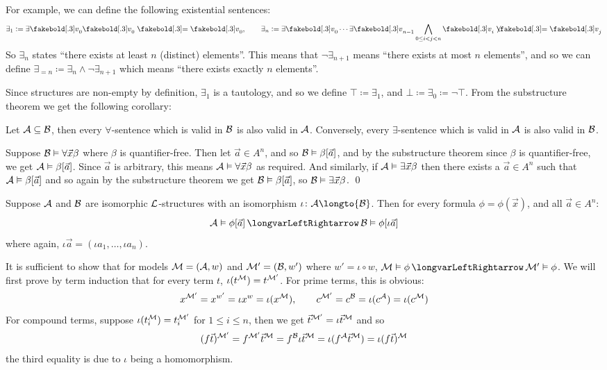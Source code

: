 \edefn

For example, we can define the following existential sentences:
$$ \exists_1 \coloneqq \exists\v_0\v_0\eq\v_0,\qquad \exists_n\coloneqq \exists\v_0\cdots\exists\v_{n-1}\bigwedge_{0\leq i<j<n}\v_i\neqb\v_j $$
So $\exists_n$ states ``there exists at least $n$ (distinct) elements''.
This means that $\neg\exists_{n+1}$ means ``there exists at most $n$ elements'', and so we can define $\exists_{=n}\coloneqq\exists_n\land\neg\exists_{n+1}$ which means ``there exists exactly $n$
elements''.

Since structures are non-empty by definition, $\exists_1$ is a tautology, and so we define $\top\coloneqq\exists_1$, and $\bot\coloneqq\exists_0\coloneqq\neg\top$.
From the substructure theorem we get the following corollary:

\bcoro[name=substructurecoro]

    Let ${\cal A}\subseteq{\cal B}$, then every $\forall$-sentence which is valid in ${\cal B}$ is also valid in ${\cal A}$.
    Conversely, every $\exists$-sentence which is valid in ${\cal A}$ is also valid in ${\cal B}$.

\ecoro

Suppose ${\cal B}\vDash\forall\vec x\beta$ where $\beta$ is quantifier-free.
Then let $\vec a\in A^n$, and so ${\cal B}\vDash\beta[\vec a]$, and by the substructure theorem since $\beta$ is quantifier-free, we get ${\cal A}\vDash\beta[\vec a]$.
Since $\vec a$ is arbitrary, this means ${\cal A}\vDash\forall\vec x\beta$ as required.
And similarly, if ${\cal A}\vDash\exists\vec x\beta$ then there exists a $\vec a\in A^n$ such that ${\cal A}\vDash\beta[\vec a]$ and so again by the substructure theorem we get ${\cal B}\vDash\beta[\vec a]$,
so ${\cal B}\vDash\exists\vec x\beta$.
\qed

\bthrm[title=The Invariance Theorem, name=invariancetheorem]

    Suppose ${\cal A}$ and ${\cal B}$ are isomorphic $\cal L$-structures with an isomorphism $\iota\colon{\cal A}\longto{\cal B}$.
    Then for every formula $\phi=\phi(\vec x)$, and all $\vec a\in A^n$:
    $$ {\cal A}\vDash\phi[\vec a] \iff {\cal B}\vDash\phi[\iota\vec a] $$
    where again, $\iota\vec a=(\iota a_1,\dots,\iota a_n)$.

\ethrm

It is sufficient to show that for models ${\cal M}=({\cal A},w)$ and ${\cal M'}=({\cal B},w')$ where $w'=\iota\circ w$, ${\cal M}\vDash\phi\iff{\cal M}'\vDash\phi$.
We will first prove by term induction that for every term $t$, $\iota(t^{\cal M})=t^{\cal M'}$.
For prime terms, this is obvious:
$$ x^{\cal M'} = x^{w'} = \iota x^w = \iota(x^{\cal M}),\qquad c^{\cal M'} = c^{\cal B} = \iota(c^{\cal A}) = \iota(c^{\cal M}) $$
For compound terms, suppose $\iota(t_i^{\cal M})=t_i^{\cal M'}$ for $1\leq i\leq n$, then we get $\vec t^{\cal M'}=\iota\vec t^{\cal M}$ and so
$$ (f\vec t)^{\cal M'} = f^{\cal M'}\vec t^{\cal M} = f^{\cal B}\iota\vec t^{\cal M} = \iota(f^{\cal A}\vec t^{\cal M}) = \iota(f\vec t)^{\cal M} $$
the third equality is due to $\iota$ being a homomorphism.

